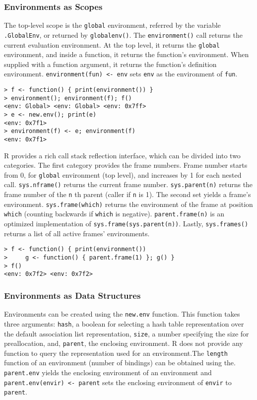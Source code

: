 \documentclass[10pt,review,sigplan,anonymous=true,authorversion=true,nonacm=true]{acmart}
\newcommand{\code}[1]{\lstinline |#1|\xspace}
\newcommand{\newEnv}{\code{new.env}}
\newcommand{\parentEnv}{\code{parent.env}}
\begin{document}
\subsubsection{Environments as Scopes}
The top-level scope is the \code{global} environment, referred by the variable
\code{.GlobalEnv}, or returned by \code{globalenv()}. The \code{environment()}
call returns the current evaluation environment. At the top level, it returns
the \code{global} environment, and inside a function, it returns the function's
environment. When supplied with a function argument, it returns the function's
definition environment. \code{environment(fun) <- env} sets \code{env} as the
environment of \code{fun}.

\begin{lstlisting}
> f <- function() { print(environment()) }
> environment(); environment(f); f()
<env: Global> <env: Global> <env: 0x7ff>
> e <- new.env(); print(e)
<env: 0x7f1>
> environment(f) <- e; environment(f)
<env: 0x7f1>
\end{lstlisting}

R provides a rich call stack reflection interface, which can be divided into two
categories. The first category provides the frame numbers. Frame number starts
from 0, for \code{global} environment (top level), and increases by 1 for each
nested call. \code{sys.nframe()} returns the current frame number.
\code{sys.parent(n)} returns the frame number of the \code{n}th parent (caller
if \code{n} is 1). The second set yields a frame's environment.
\code{sys.frame(which)} returns the environment of the frame at position
\code{which} (counting backwards if \code{which} is negative).
\code{parent.frame(n)} is an optimized implementation of
\code{sys.frame(sys.parent(n))}. Lastly, \code{sys.frames()} returns a list of
all active frames' environments.

\begin{lstlisting}
> f <- function() { print(environment())
>     g <- function() { parent.frame(1) }; g() }
> f()
<env: 0x7f2> <env: 0x7f2>
\end{lstlisting}

\subsubsection{Environments as Data Structures}
Environments can be created using the \newEnv function. This function takes
three arguments: \code{hash}, a boolean for selecting a hash table
representation over the default association list representation, \code{size}, a
number specifying the size for preallocation, and, \code{parent}, the enclosing
environment. R does not provide any function to query the representation used
for an environment.The \code{length} function of an environment (number of
bindings) can be obtained using the. \parentEnv yields the enclosing environment
of an environment and \code{parent.env(envir) <- parent} sets the enclosing
environment of \code{envir} to \code{parent}.
\end{document}
